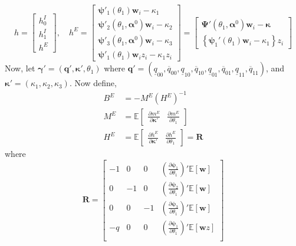 \[
  h  = \left[
  \begin{array}{c}
    h^I_0 \\ h^I_1 \\ h^E
  \end{array}
\right], \quad
  h^E  =  \left[
 \begin{array}{l}
   \boldsymbol{\psi}'_1(\theta_1)\mathbf{w}_i - \kappa_1\\
   \boldsymbol{\psi}'_2(\theta_1,\boldsymbol{\alpha}^0)\mathbf{w}_i - \kappa_2\\
   \boldsymbol{\psi}'_3(\theta_1,\boldsymbol{\alpha}^0)\mathbf{w}_i - \kappa_3\\ 
   \boldsymbol{\psi}'_1(\theta_1)\mathbf{w}_i z_i - \kappa_1 z_i
 \end{array}
 \right] = \left[
 \begin{array}{l}
   \boldsymbol{\Psi}'(\theta_1, \boldsymbol{\alpha}^0) \mathbf{w}_i - \boldsymbol{\kappa}\\
   \left\{\boldsymbol{\psi}_1'(\theta_1)\mathbf{w}_i - \kappa_1\right\}z_i
 \end{array}
 \right]
\]
Now, let $\boldsymbol{\gamma}' = (\mathbf{q}', \boldsymbol{\kappa}', \theta_1)$ where $\mathbf{q}' = ( \underline{q}_{00}, \overline{q}_{00}, \underline{q}_{10}, \overline{q}_{10}, \underline{q}_{01}, \overline{q}_{01}, \underline{q}_{11}, \overline{q}_{11})$, and $\boldsymbol{\kappa}' = (\kappa_1, \kappa_2, \kappa_3)$.
Now define,
\begin{align*}
  B^E &= -M^E (H^E)^{-1}\\
  M^E &= \mathbb{E}\left[
  \begin{array}{cc}
    \displaystyle \frac{\partial m^E}{\partial \boldsymbol{\kappa}'} &
    \displaystyle \frac{\partial m^E}{\partial \theta_1}
  \end{array}
\right]\\
H^E &= \mathbb{E}\left[
  \begin{array}{cc}
    \displaystyle \frac{\partial h^E}{\partial \boldsymbol{\kappa}'} &
    \displaystyle \frac{\partial h^E}{\partial \theta_1}
  \end{array}
\right] = \mathbf{R}
\end{align*}
where
\[
\mathbf{R} = \left[
\begin{array}{rrrr}
  -1 & 0 & 0 
  & \displaystyle \left(\frac{\partial \boldsymbol{\psi}_1}{\partial \theta_1}\right)'\mathbb{E}[\mathbf{w}]\\
   0 & -1 & 0 & \displaystyle \left(\frac{\partial \boldsymbol{\psi}_2}{\partial \theta_1}\right)'\mathbb{E}[\mathbf{w}]\\
   0 & 0 & -1 & \displaystyle \left(\frac{\partial \boldsymbol{\psi}_3}{\partial \theta_1}\right)'\mathbb{E}[\mathbf{w}]\\
   -q & 0 & 0 &  \displaystyle \left(\frac{\partial \boldsymbol{\psi}_1}{\partial \theta_1}\right)'\mathbb{E}[\mathbf{w}z]\\
\end{array}
\right]
\]
